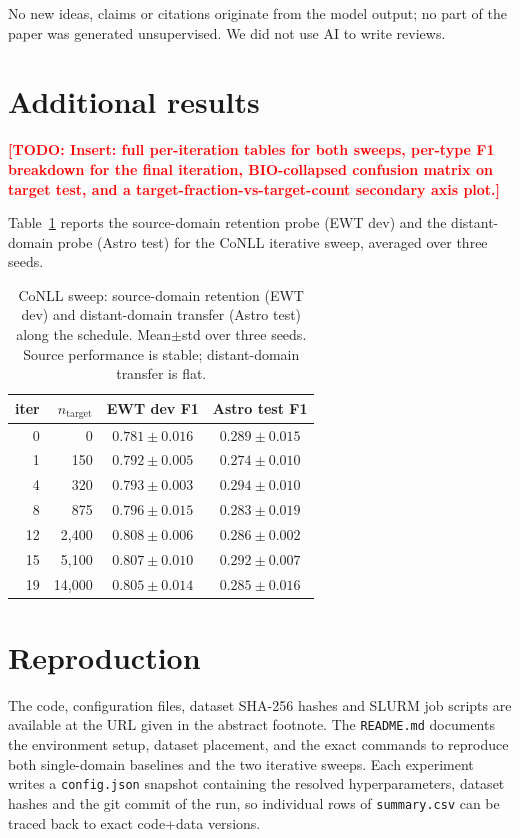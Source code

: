 \documentclass[11pt]{article}
\newcommand{\todo}[1]{\textcolor{red}{\textbf{[TODO: #1]}}}
\begin{document}
\noindent No new ideas, claims or citations originate from the model output;
no part of the paper was generated unsupervised. We did not use AI to
write reviews.

\section{Additional results}
\label{sec:app-extra}

\todo{Insert: full per-iteration tables for both sweeps, per-type F1
breakdown for the final iteration, BIO-collapsed confusion matrix on
target test, and a target-fraction-vs-target-count secondary axis plot.}

Table~\ref{tab:source-retention} reports the source-domain retention probe
(EWT dev) and the distant-domain probe (Astro test) for the CoNLL iterative
sweep, averaged over three seeds.

\begin{table}[h]
  \centering
  \small
  \begin{tabular}{rrcc}
    \toprule
    iter & $n_{\text{target}}$ & EWT dev F1 & Astro test F1 \\
    \midrule
    0  &     0 & $0.781\pm 0.016$ & $0.289\pm 0.015$ \\
    1  &   150 & $0.792\pm 0.005$ & $0.274\pm 0.010$ \\
    4  &   320 & $0.793\pm 0.003$ & $0.294\pm 0.010$ \\
    8  &   875 & $0.796\pm 0.015$ & $0.283\pm 0.019$ \\
    12 & 2{,}400 & $0.808\pm 0.006$ & $0.286\pm 0.002$ \\
    15 & 5{,}100 & $0.807\pm 0.010$ & $0.292\pm 0.007$ \\
    19 & 14{,}000 & $0.805\pm 0.014$ & $0.285\pm 0.016$ \\
    \bottomrule
  \end{tabular}
  \caption{CoNLL sweep: source-domain retention (EWT dev) and distant-domain
    transfer (Astro test) along the schedule. Mean$\pm$std over three seeds.
    Source performance is stable; distant-domain transfer is flat.}
  \label{tab:source-retention}
\end{table}

\section{Reproduction}
\label{sec:app-repro}

The code, configuration files, dataset SHA-256 hashes and SLURM job scripts
are available at the URL given in the abstract footnote. The
\texttt{README.md} documents the environment setup, dataset placement, and
the exact commands to reproduce both single-domain baselines and the two
iterative sweeps. Each experiment writes a \texttt{config.json} snapshot
containing the resolved hyperparameters, dataset hashes and the git commit
of the run, so individual rows of \texttt{summary.csv} can be traced back to
exact code+data versions.
\end{document}
